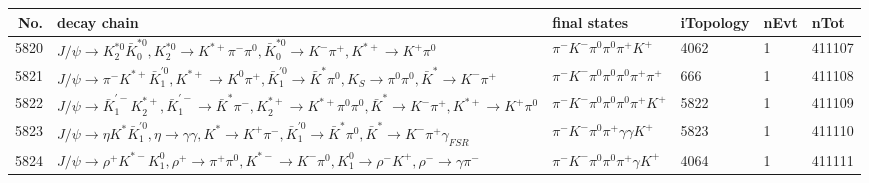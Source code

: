 \begin{table}[htbp] 
\begin{center}
\begin{small}
\begin{tabular}{rlllll}\hline\hline
 No. & decay chain & final states &  iTopology & nEvt & nTot \\\hline
5820&$J/\psi       \rightarrow K_2^{*0}       \bar{K}_0^{*0}, K_2^{*0}        \rightarrow K^{*+}         \pi^{-}        \pi^{0}        , \bar{K}_0^{*0} \rightarrow K^{-}          \pi^{+}        , K^{*+}          \rightarrow K^{+}          \pi^{0}        $&$\pi^{-}        K^{-}          \pi^{0}        \pi^{0}        \pi^{+}        K^{+}          $& 4062&    1&411107\\
5821&$J/\psi       \rightarrow \pi^{-}        K^{*+}         \bar{K}_1^{'0}, K^{*+}          \rightarrow K^{0}          \pi^{+}        , \bar{K}_1^{'0} \rightarrow \bar{K}^{*}   \pi^{0}        , K_{S}           \rightarrow \pi^{0}        \pi^{0}        , \bar{K}^{*}    \rightarrow K^{-}          \pi^{+}        $&$\pi^{-}        K^{-}          \pi^{0}        \pi^{0}        \pi^{0}        \pi^{+}        \pi^{+}        $&  666&    1&411108\\
5822&$J/\psi       \rightarrow \bar{K}_1^{'-}K_2^{*+}       , \bar{K}_1^{'-} \rightarrow \bar{K}^{*}   \pi^{-}        , K_2^{*+}        \rightarrow K^{*+}         \pi^{0}        \pi^{0}        , \bar{K}^{*}    \rightarrow K^{-}          \pi^{+}        , K^{*+}          \rightarrow K^{+}          \pi^{0}        $&$\pi^{-}        K^{-}          \pi^{0}        \pi^{0}        \pi^{0}        \pi^{+}        K^{+}          $& 5822&    1&411109\\
5823&$J/\psi       \rightarrow \eta          K^{*}          \bar{K}_1^{'0}, \eta           \rightarrow \gamma       \gamma       , K^{*}           \rightarrow K^{+}          \pi^{-}        , \bar{K}_1^{'0} \rightarrow \bar{K}^{*}   \pi^{0}        , \bar{K}^{*}    \rightarrow K^{-}          \pi^{+}        \gamma_{FSR} $&$\pi^{-}        K^{-}          \pi^{0}        \pi^{+}        \gamma       \gamma       K^{+}          $& 5823&    1&411110\\
5824&$J/\psi       \rightarrow \rho^{+}      K^{*-}         K_1^{0}        , \rho^{+}       \rightarrow \pi^{+}        \pi^{0}        , K^{*-}          \rightarrow K^{-}          \pi^{0}        , K_1^{0}         \rightarrow \rho^{-}      K^{+}          , \rho^{-}       \rightarrow \gamma       \pi^{-}        $&$\pi^{-}        K^{-}          \pi^{0}        \pi^{0}        \pi^{+}        \gamma       K^{+}          $& 4064&    1&411111\\

\end{tabular}
\end{small}
\end{center}
\end{table}
